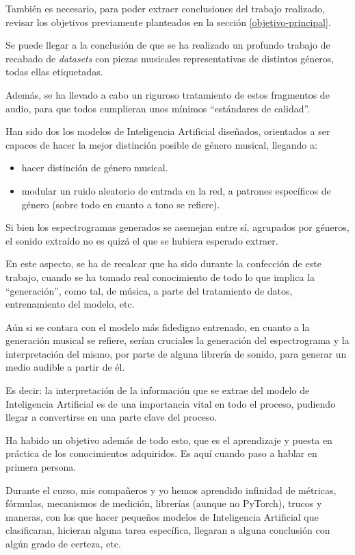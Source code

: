 También es necesario, para poder extraer conclusiones del trabajo realizado, revisar los objetivos previamente planteados en la sección \ref{objetivo-principal}.

Se puede llegar a la conclusión de que se ha realizado un profundo trabajo de recabado de \emph{datasets} con piezas musicales representativas de distintos géneros, todas ellas etiquetadas.

Además, se ha llevado a cabo un riguroso tratamiento de estos fragmentos de audio, para que todos cumplieran unos mínimos ``estándares de calidad''.

Han sido dos los modelos de Inteligencia Artificial diseñados, orientados a ser capaces de hacer la mejor distinción posible de género musical, llegando a:
\begin{itemize}
    \item hacer distinción de género musical.
    \item modular un ruido aleatorio de entrada en la red, a patrones específicos de género (sobre todo en cuanto a tono se refiere).
\end{itemize}

Si bien los espectrogramas generados se asemejan entre sí, agrupados por géneros, el sonido extraído no es quizá el que se hubiera esperado extraer.

En este aspecto, se ha de recalcar que ha sido durante la confección de este trabajo, cuando se ha tomado real conocimiento de todo lo que implica la ``generación'', como tal, de música, a parte del tratamiento de datos, entrenamiento del modelo, etc.

Aún si se contara con el modelo más fidedigno entrenado, en cuanto a la generación musical se refiere, serían cruciales la generación del espectrograma y la interpretación del mismo, por parte de alguna librería de sonido, para generar un medio audible a partir de él.

Es decir: la interpretación de la información que se extrae del modelo de Inteligencia Artificial es de una importancia vital en todo el proceso, pudiendo llegar a convertirse en una parte clave del proceso.

Ha habido un objetivo además de todo esto, que es el aprendizaje y puesta en práctica de los conocimientos adquiridos. Es aquí cuando paso a hablar en primera persona.

Durante el curso, mis compañeros y yo hemos aprendido infinidad de métricas, fórmulas, mecanismos de medición, librerías (aunque no PyTorch), trucos y maneras, con los que hacer pequeños modelos de Inteligencia Artificial que clasificaran, hicieran alguna tarea específica, llegaran a alguna conclusión con algún grado de certeza, etc.


